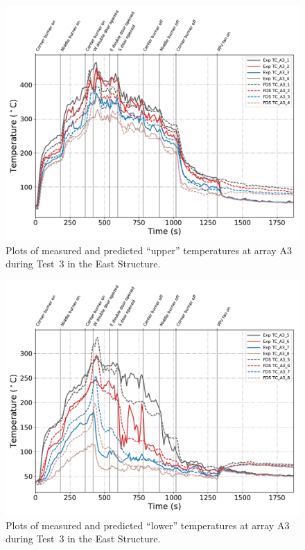 \clearpage
\begin{figure}[p]
	\centering
	\includegraphics[width=\columnwidth]{Figures/Plots/Validation/Temperature/Test_3_TC_A3_upper}
	\caption{Plots of measured and predicted ``upper'' temperatures at array A3 during Test~3 in the East Structure.}
	\label{fig:TCA3_upper_data_Test3}
\end{figure}
\begin{figure}[p]
	\centering
	\includegraphics[width=\columnwidth]{Figures/Plots/Validation/Temperature/Test_3_TC_A3_lower}
	\caption{Plots of measured and predicted ``lower'' temperatures at array A3 during Test~3 in the East Structure.}
	\label{fig:TCA3_lower_data_Test3}
\end{figure}

